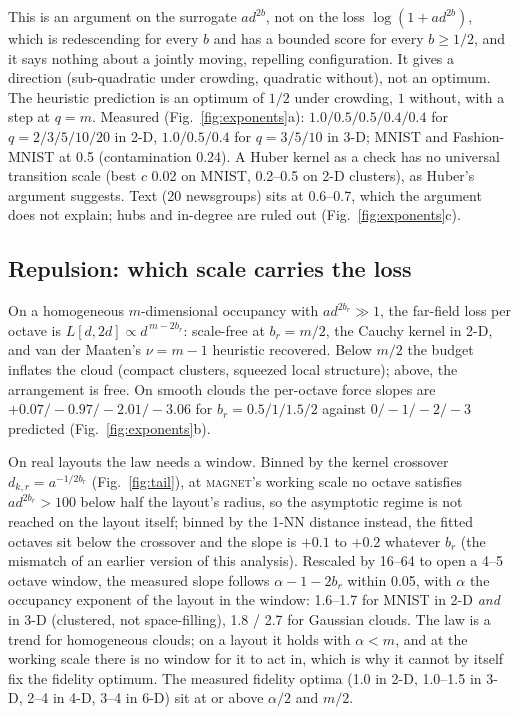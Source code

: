 \documentclass[11pt]{article}
\newcommand{\magnet}{\textsc{magnet}}
\begin{document}
This is an argument on the surrogate $a d^{2b}$, not on the loss $\log(1 + a d^{2b})$, which is
redescending for every $b$ and has a bounded score for every $b \ge 1/2$, and it says nothing about a
jointly moving, repelling configuration. It gives a direction (sub-quadratic under crowding, quadratic
without), not an optimum. The heuristic prediction is an optimum of $1/2$ under crowding, $1$ without,
with a step at $q = m$. Measured (Fig.~\ref{fig:exponents}a): $1.0 / 0.5 / 0.5 / 0.4 / 0.4$ for
$q = 2 / 3 / 5 / 10 / 20$ in 2-D, $1.0 / 0.5 / 0.4$ for $q = 3 / 5 / 10$ in 3-D; MNIST and Fashion-MNIST
at 0.5 (contamination 0.24). A Huber kernel as a check has no universal transition scale (best $c$ 0.02
on MNIST, 0.2--0.5 on 2-D clusters), as Huber's argument suggests. Text (20 newsgroups) sits at 0.6--0.7,
which the argument does not explain; hubs and in-degree are ruled out (Fig.~\ref{fig:exponents}c).

\subsection{Repulsion: which scale carries the loss}
On a homogeneous $m$-dimensional occupancy with $a d^{2b_r} \gg 1$, the far-field loss per octave is
$L[d, 2d] \propto d^{\,m - 2b_r}$: scale-free at $b_r = m/2$, the Cauchy kernel in 2-D, and van der
Maaten's $\nu = m - 1$ heuristic recovered. Below $m/2$ the budget inflates the cloud (compact clusters,
squeezed local structure); above, the arrangement is free. On smooth clouds the per-octave force slopes
are $+0.07 / -0.97 / -2.01 / -3.06$ for $b_r = 0.5 / 1 / 1.5 / 2$ against $0 / -1 / -2 / -3$ predicted
(Fig.~\ref{fig:exponents}b).

On real layouts the law needs a window. Binned by the kernel crossover $d_{k,r} = a^{-1/2b_r}$
(Fig.~\ref{fig:tail}), at \magnet{}'s working scale no octave satisfies $a d^{2b_r} > 100$ below half
the layout's radius, so the asymptotic regime is not reached on the layout itself; binned by the 1-NN
distance instead, the fitted octaves sit below the crossover and the slope is $+0.1$ to $+0.2$ whatever
$b_r$ (the mismatch of an earlier version of this analysis). Rescaled by 16--64 to open a 4--5 octave
window, the measured slope follows $\alpha - 1 - 2b_r$ within 0.05, with $\alpha$ the occupancy exponent
of the layout in the window: 1.6--1.7 for MNIST in 2-D \emph{and} in 3-D (clustered, not space-filling),
1.8 / 2.7 for Gaussian clouds. The law is a trend for homogeneous clouds; on a layout it holds with
$\alpha < m$, and at the working scale there is no window for it to act in, which is why it cannot by
itself fix the fidelity optimum. The measured fidelity optima (1.0 in 2-D, 1.0--1.5 in 3-D, 2--4 in 4-D,
3--4 in 6-D) sit at or above $\alpha/2$ and $m/2$.
\end{document}
